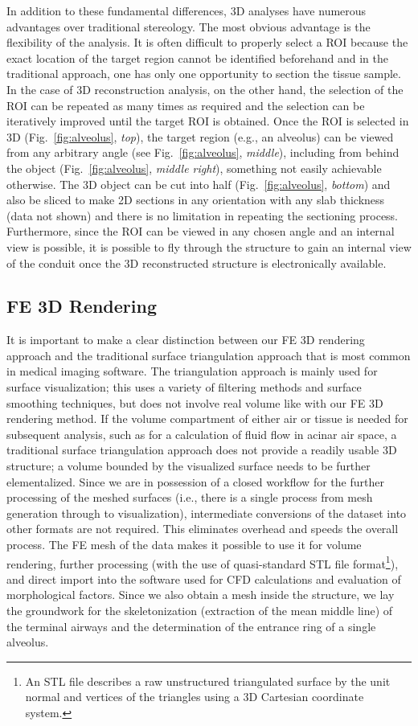 In addition to these fundamental differences, 3D analyses have numerous advantages over traditional stereology. The most obvious advantage is the flexibility of the analysis. It is often difficult to properly select a ROI because the exact location of the target region cannot be identified beforehand and in the traditional approach, one has only one opportunity to section the tissue sample. In the case of 3D reconstruction analysis, on the other hand, the selection of the ROI can be repeated as many times as required and the selection can be iteratively improved until the target ROI is obtained. Once the ROI is selected in 3D (Fig.~\ref{fig:alveolus}, \textit{top}), the target region (e.g., an alveolus) can be viewed from any arbitrary angle (see Fig.~\ref{fig:alveolus}, \textit{middle}), including from behind the object (Fig.~\ref{fig:alveolus}, \textit{middle right}), something not easily achievable otherwise. The 3D object can be cut into half (Fig.~\ref{fig:alveolus}, \textit{bottom}) and also be sliced to make 2D sections in any orientation with any slab thickness (data not shown) and there is no limitation in repeating the sectioning process. Furthermore, since the ROI can be viewed in any chosen angle and an internal view is possible, it is possible to fly through the structure to gain an internal view of the conduit once the 3D reconstructed structure is electronically available.

\subsection{FE 3D Rendering}
It is important to make a clear distinction between our FE 3D rendering approach and the traditional surface triangulation approach that is most common in medical imaging software. The triangulation approach is mainly used for surface visualization; this uses a variety of filtering methods and surface smoothing techniques, but does not involve real volume like with our FE 3D rendering method. If the volume compartment of either air or tissue is needed for subsequent analysis, such as for a calculation of fluid flow in acinar air space, a traditional surface triangulation approach does not provide a readily usable 3D structure; a volume bounded by the visualized surface needs to be further elementalized. Since we are in possession of a closed workflow for the further processing of the meshed surfaces (i.e., there is a single process from mesh generation through to visualization), intermediate conversions of the dataset into other formats are not required. This eliminates overhead and speeds the overall process. The FE mesh of the data makes it possible to use it for volume rendering, further processing (with the use of quasi-standard STL file format\footnote{An STL file describes a raw unstructured triangulated surface by the unit normal and vertices of the triangles using a 3D Cartesian coordinate system.}), and direct import into the software used for CFD calculations and evaluation of morphological factors. Since we also obtain a mesh inside the structure, we lay the groundwork for the skeletonization (extraction of the mean middle line) of the terminal airways and the determination of the entrance ring of a single alveolus.

